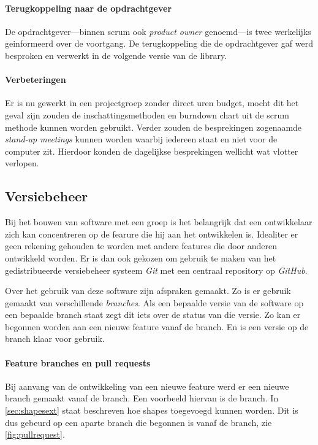 \paragraph{Terugkoppeling naar de opdrachtgever} De opdrachtgever—binnen scrum ook \emph{product owner} genoemd—is twee werkelijks geinformeerd over de voortgang. De terugkoppeling die de opdrachtgever gaf werd besproken en verwerkt in de volgende versie van de library.

\paragraph{Verbeteringen} Er is nu gewerkt in een projectgroep zonder direct uren budget, mocht dit het geval zijn zouden de inschattingsmethoden en burndown chart uit de scrum methode kunnen worden gebruikt. Verder zouden de besprekingen zogenaamde \emph{stand-up meetings} kunnen worden waarbij iedereen staat en niet voor de computer zit. Hierdoor konden de dagelijkse besprekingen wellicht wat vlotter verlopen.

\subsection{Versiebeheer}
Bij het bouwen van software met een groep is het belangrijk dat een ontwikkelaar zich kan concentreren op de fearure die hij aan het ontwikkelen is. Idealiter er geen rekening gehouden te worden met andere features die door anderen ontwikkeld worden. Er is dan ook gekozen om gebruik te maken van het gedistribueerde versiebeheer systeem \emph{Git} met een centraal repository op \emph{GitHub}.

Over het gebruik van deze software zijn afspraken gemaakt. Zo is er gebruik gemaakt van verschillende \emph{branches}. Als een bepaalde versie van de software op een bepaalde branch staat zegt dit iets over de status van die versie. Zo kan er begonnen worden aan een nieuwe feature vanaf de  branch. En is een versie op de  branch klaar voor gebruik.

\paragraph{Feature branches en pull requests}
Bij aanvang van de ontwikkeling van een nieuwe feature werd er een nieuwe branch gemaakt vanaf de  branch. Een voorbeeld hiervan is de  branch. In \autoref{sec:shapesext} staat beschreven hoe  shapes toegevoegd kunnen worden. Dit is dus gebeurd op een aparte branch die begonnen is vanaf de  branch, zie \autoref{fig:pullrequest}. 

